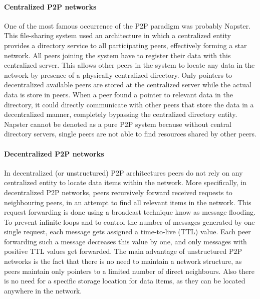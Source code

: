\paragraph{Centralized P2P networks} One of the most famous occurrence of the P2P paradigm was probably Napster\cite{Carlsson:2001:RFN:647728.734520}. This file-sharing system used an architecture in which a centralized entity provides a directory service to all participating peers, effectively forming a star network. All peers joining the system have to register their data with this centralized server. This allows other peers in the system to locate any data in the network by presence of a physically centralized directory. Only pointers to decentralized available peers are stored at the centralized server while the actual data is store in peers. When a peer found a pointer to relevant data in the directory, it could directly communicate with other peers that store the data in a decentralized manner, completely bypassing the centralized directory entity. Napster cannot be denoted as a pure P2P system because without central directory servers, single peers are not able to find resources shared by other peers.
\\

\paragraph{Decentralized P2P networks}
In decentralized (or unstructured) P2P architectures peers do not rely on any centralized entity to locate data items within the network. More specifically, in decentralized P2P networks, peers recursively forward received requests to neighbouring peers, in an attempt to find all relevant items in the network. This request forwarding is done using a broadcast technique know as message flooding. To prevent infinite loops and to control the number of messages generated by one single request, each message gets assigned a time-to-live (TTL) value. Each peer forwarding such a message decreases this value by one, and only messages with positive TTL values get forwarded. The main advantage of unstructured P2P networks is the fact that there is no need to maintain a network structure, as peers maintain only pointers to a limited number of direct neighbours. Also there is no need for a specific storage location for data items, as they can be located anywhere in the network.
\\


